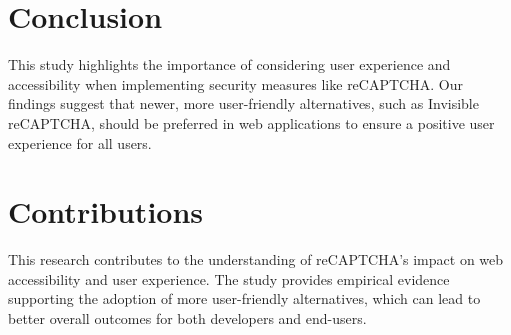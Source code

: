 \documentclass{article}
\begin{document}
\section{Conclusion}
This study highlights the importance of considering user experience and accessibility when implementing security measures like reCAPTCHA. Our findings suggest that newer, more user-friendly alternatives, such as Invisible reCAPTCHA, should be preferred in web applications to ensure a positive user experience for all users.

\section{Contributions}
This research contributes to the understanding of reCAPTCHA's impact on web accessibility and user experience. The study provides empirical evidence supporting the adoption of more user-friendly alternatives, which can lead to better overall outcomes for both developers and end-users.



\end{document}

